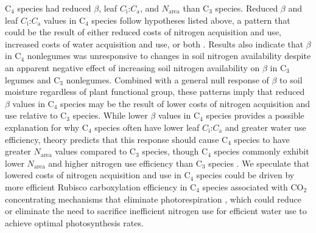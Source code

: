 C$_4$ species had reduced $\beta$, leaf $C_\mathrm{i}$:$C_\mathrm{a}$, and $N_\mathrm{area}$ than C$_3$ species. Reduced $\beta$ and leaf $C_\mathrm{i}$:$C_\mathrm{a}$ values in C$_4$ species follow hypotheses listed above, a pattern that could be the result of either reduced costs of nitrogen acquisition and use, increased costs of water acquisition and use, or both . Results also indicate that $\beta$ in C$_4$ nonlegumes was unresponsive to changes in soil nitrogen availability despite an apparent negative effect of increasing soil nitrogen availability on $\beta$ in C$_3$ legumes and C$_3$ nonlegumes. Combined with a general null response of $\beta$ to soil moisture regardless of plant functional group, these patterns imply that reduced $\beta$ values in C$_4$ species may be the result of lower costs of nitrogen acquisition and use relative to C$_3$ species. While lower $\beta$ values in C$_4$ species provides a possible explanation for why C$_4$ species often have lower leaf $C_\mathrm{i}$:$C_\mathrm{a}$ and greater water use efficiency, theory predicts that this response should cause C$_4$ species to have greater $N_\mathrm{area}$ values compared to C$_3$ species, though C$_4$ species commonly exhibit lower $N_\mathrm{area}$ and higher nitrogen use efficiency than C$_3$ species . We speculate that lowered costs of nitrogen acquisition and use in C$_4$ species could be driven by more efficient Rubisco carboxylation efficiency in C$_4$ species associated with CO$_2$ concentrating mechanisms that eliminate photorespiration , which could reduce or eliminate the need to sacrifice inefficient nitrogen use for efficient water use to achieve optimal photosynthesis rates.


